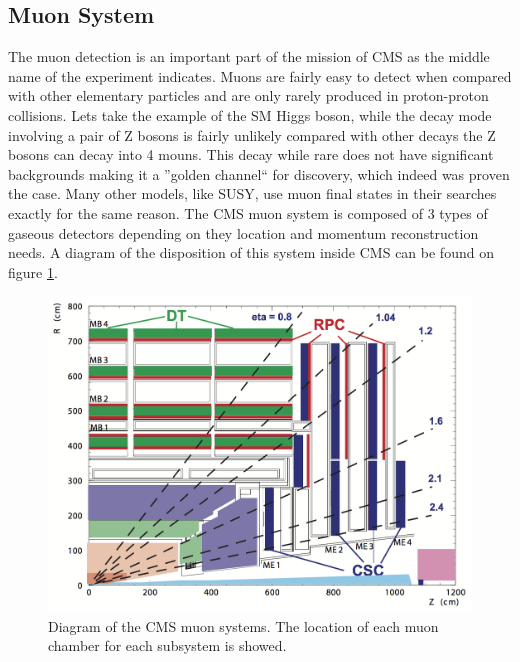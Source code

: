 

\subsection{Muon System}
\label{SUBSECTION:ExperimentalApparatus_CMS_Moun}


The muon detection is an important part of the mission of \gls{CMS} as the middle name of the experiment indicates. Muons are fairly easy to detect when compared with other elementary particles and are only rarely produced in proton-proton collisions. Lets take the example of the \gls{SM} Higgs boson, while the decay mode involving a pair of Z bosons is fairly unlikely compared with other decays the Z bosons can decay into 4 mouns. This decay while rare does not have significant backgrounds making it a ''golden channel`` for discovery, which indeed was proven the case. Many other models, like SUSY, use muon final states in their searches exactly for the same reason. The \gls{CMS} muon system is composed of 3 types of gaseous detectors depending on they location and momentum reconstruction needs. A diagram of the disposition of this system inside \gls{CMS} can be found on figure \ref{FIGURE:ExperimentalApparatus_CMS_Muon_Layout}.

\begin{figure}[!htb]
  \centering
  \includegraphics{Chapter02/CMS/Images/CMS_Muon_Layout.png}
  \caption{Diagram of the \gls{CMS} muon systems. The location of each muon chamber for each subsystem is showed.}
  \label{FIGURE:ExperimentalApparatus_CMS_Muon_Layout}
\end{figure}

